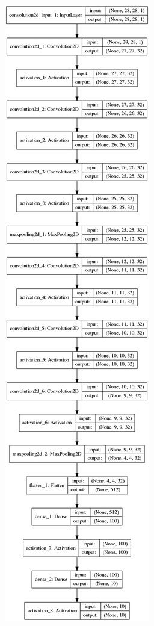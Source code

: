 \documentclass[tikz,11pt]{beamer}
\begin{document}
\begin{frame}
\begin{figure}
\begin{minipage}{.33\textwidth}
		\includegraphics[width=.4\linewidth, height=.9\textheight]{images/resultados/network_1/model}
	\end{minipage}%
	\begin{minipage}{.34\textwidth}
	\centering

\end{minipage}
\end{figure}
\end{frame}
\end{document}
